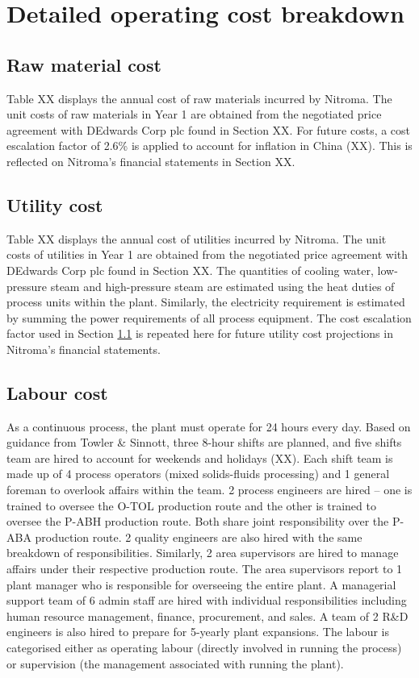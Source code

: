 \section{Detailed operating cost breakdown}
\subsection{Raw material cost}
\label{sec:opex-raw-material}
Table XX displays the annual cost of raw materials incurred by Nitroma. The unit costs of raw materials in Year 1 are obtained from the negotiated price agreement with DEdwards Corp plc found in Section XX. For future costs, a cost escalation factor of 2.6\% is applied to account for inflation in China (XX). This is reflected on Nitroma’s financial statements in Section XX.

\subsection{Utility cost}
Table XX displays the annual cost of utilities incurred by Nitroma. The unit costs of utilities in Year 1 are obtained from the negotiated price agreement with DEdwards Corp plc found in Section XX. The quantities of cooling water, low-pressure steam and high-pressure steam are estimated using the heat duties of process units within the plant. Similarly, the electricity requirement is estimated by summing the power requirements of all process equipment. The cost escalation factor used in Section \ref{sec:opex-raw-material} is repeated here for future utility cost projections in Nitroma’s financial statements.  

\subsection{Labour cost}
As a continuous process, the plant must operate for 24 hours every day. Based on guidance from Towler \& Sinnott, three 8-hour shifts are planned, and five shifts team are hired to account for weekends and holidays (XX). Each shift team is made up of 4 process operators (mixed solids-fluids processing) and 1 general foreman to overlook affairs within the team. 2 process engineers are hired – one is trained to oversee the O-TOL production route and the other is trained to oversee the P-ABH production route. Both share joint responsibility over the P-ABA production route. 2 quality engineers are also hired with the same breakdown of responsibilities.  Similarly, 2 area supervisors are hired to manage affairs under their respective production route. The area supervisors report to 1 plant manager who is responsible for overseeing the entire plant. A managerial support team of 6 admin staff are hired with individual responsibilities including human resource management, finance, procurement, and sales. A team of 2 R\&D engineers is also hired to prepare for 5-yearly plant expansions. The labour is categorised either as operating labour (directly involved in running the process) or supervision (the management associated with running the plant).

